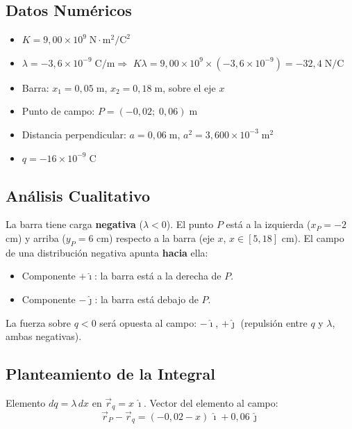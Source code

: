 \documentclass[12pt,letterpaper]{article}
\begin{document}
\subsection*{Datos Num\'ericos}

\begin{itemize}
    \item $K = 9{,}00\times10^9\;\text{N}\cdot\text{m}^2/\text{C}^2$
    \item $\lambda = -3{,}6\times10^{-9}\;\text{C/m}$\quad$\Rightarrow$\quad
          $K\lambda = 9{,}00\times10^9\times(-3{,}6\times10^{-9}) = -32{,}4\;\text{N/C}$
    \item Barra: $x_1 = 0{,}05\;\text{m}$,\; $x_2 = 0{,}18\;\text{m}$, sobre el eje $x$
    \item Punto de campo: $P = (-0{,}02;\;0{,}06)\;\text{m}$
    \item Distancia perpendicular: $a = 0{,}06\;\text{m}$,\; $a^2 = 3{,}600\times10^{-3}\;\text{m}^2$
    \item $q = -16\times10^{-9}\;\text{C}$
\end{itemize}

\subsection*{An\'alisis Cualitativo}

La barra tiene carga \textbf{negativa} ($\lambda < 0$). El punto $P$ est\'a a la izquierda
($x_P=-2$ cm) y arriba ($y_P=6$ cm) respecto a la barra (eje $x$, $x\in[5,18]$ cm).
El campo de una distribuci\'on negativa apunta \textbf{hacia} ella:
\begin{itemize}
    \item Componente $+\hat{\imath}$: la barra est\'a a la derecha de $P$.
    \item Componente $-\hat{\jmath}$: la barra est\'a debajo de $P$.
\end{itemize}
La fuerza sobre $q < 0$ ser\'a opuesta al campo: $-\hat{\imath}$, $+\hat{\jmath}$
(repulsi\'on entre $q$ y $\lambda$, ambas negativas).

\subsection*{Planteamiento de la Integral}

Elemento $dq = \lambda\,dx$ en $\vec{r}_q = x\,\hat{\imath}$. Vector del elemento al campo:
\begin{equation*}
    \vec{r}_P - \vec{r}_q = (-0{,}02-x)\,\hat{\imath} + 0{,}06\,\hat{\jmath}
\end{equation*}
\end{document}
